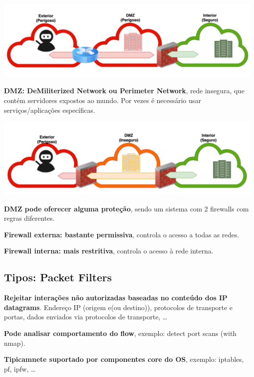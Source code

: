 \documentclass{article}
\begin{document}
\begin{center}
  \includegraphics[scale=0.4]{53}
\end{center}

\begin{flushleft}
  \textbf{DMZ: DeMiliterized Network ou Perimeter Network}, rede insegura, que contém
  servidores expostos ao mundo. Por vezes é necessário usar serviços/aplicações
  específicas.
\end{flushleft}

\begin{center}
  \includegraphics[scale=0.4]{54}
\end{center}

\begin{flushleft}
  \textbf{DMZ pode oferecer alguma proteção}, sendo um sistema com 2 firewalls com
  regras diferentes.

  \vspace{2mm}

  \textbf{Firewall externa: bastante permissiva}, controla o acesso a todas as redes.

  \vspace{2mm}

  \textbf{Firewall interna: mais restritiva}, controla o acesso à rede interna.
\end{flushleft}

\pagebreak

\subsection{Tipos: Packet Filters}

\begin{flushleft}
  \textbf{Rejeitar interações não autorizadas baseadas no conteúdo dos
  IP datagrams}. Endereço IP (origem e(ou destino)), protocolos de transporte e portas,
  dados enviados via protocolos de transporte, \dots

  \vspace{2mm}

  \textbf{Pode analisar comportamento do flow}, exemplo: detect port
  scans (with nmap).

  \vspace{2mm}

  \textbf{Tipicamnete suportado por componentes core do OS}, exemplo: iptables,
  pf, ipfw, \dots
\end{flushleft}
\end{document}

